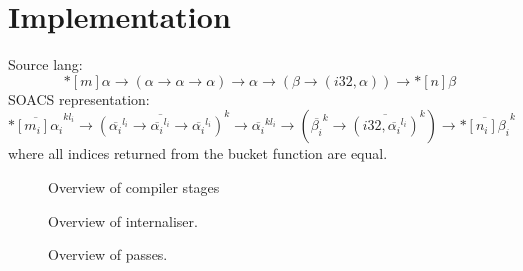 \chapter{Implementation}
\label{chap:implementation}

Source lang:
%
\begin{equation}
  *[m]\alpha \rightarrow
  \left(
      \alpha \rightarrow \alpha \rightarrow \alpha
  \right) \rightarrow
  \alpha \rightarrow
  \left(
      \beta \rightarrow \left( i32, \alpha \right)
  \right) \rightarrow
  *[n]\beta
\end{equation}
%
SOACS representation:
%
%
\begin{equation}
  \overline{*[m_i]\alpha_i}^{kl_i} \rightarrow
  \overline{
  \left(
      \overline{\alpha_i}^{l_i} \rightarrow
      \overline{\alpha_i}^{l_i} \rightarrow
      \overline{\alpha_i}^{l_i}
  \right)}^k \rightarrow
  \overline{\alpha_i}^{kl_i} \rightarrow
  \left(
      \overline{\beta_i}^k \rightarrow
      \overline{ \left( i32, \overline{\alpha_i}^{l_i} \right) }^k
  \right) \rightarrow
  \overline{*[n_i]\beta_i}^k
\end{equation}
%
where all indices returned from the bucket function are equal.

%
\begin{figure}
\begin{center}

\end{center}
\caption{Overview of compiler stages}
\label{fig:pipeline}
\end{figure}
%
%
\begin{figure}
\begin{center}

\end{center}
\caption{Overview of internaliser.}
\label{fig:internaliser}
\end{figure}
%
%
\begin{figure}
\begin{center}

\end{center}
\caption{Overview of passes.}
\label{fig:passes}
\end{figure}
%
